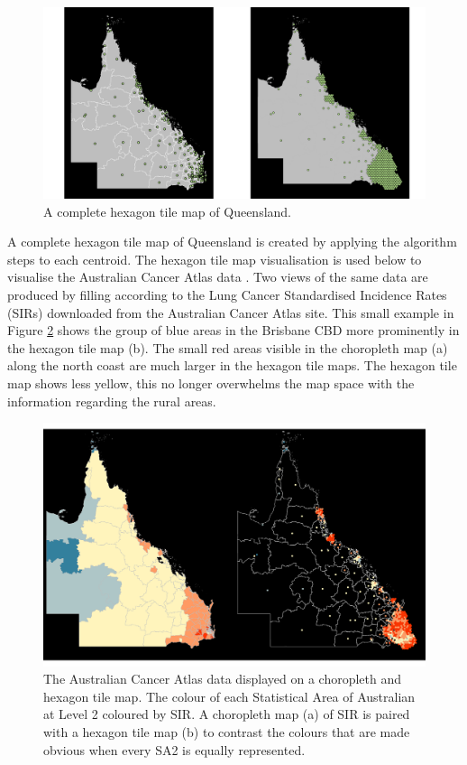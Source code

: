 \begin{figure}[h]
\centering
\includegraphics[width=16cm]{figures/6allocate.pdf}
\caption{\label{fig:buffs}A complete hexagon tile map of Queensland.}
\end{figure}

A complete hexagon tile map of Queensland is created by applying the
algorithm steps to each centroid. The hexagon tile map visualisation is
used below to visualise the Australian Cancer Atlas data \citep{TACA}.
Two views of the same data are produced by filling according to the Lung
Cancer Standardised Incidence Rates (SIRs) downloaded from the
Australian Cancer Atlas site. This small example in Figure \ref{fig:sir}
shows the group of blue areas in the Brisbane CBD more prominently in
the hexagon tile map (b). The small red areas visible in the choropleth
map (a) along the north coast are much larger in the hexagon tile maps.
The hexagon tile map shows less yellow, this no longer overwhelms the
map space with the information regarding the rural areas.

\begin{figure}[h]
\centering
\includegraphics[width=14cm]{figures/7SIR.pdf}
\caption{\label{fig:sir}The Australian Cancer Atlas data displayed on a choropleth and hexagon tile map. The colour of each Statistical Area of Australian at Level 2 coloured by SIR. A choropleth map (a) of SIR is paired with a hexagon tile map (b) to contrast the colours that are made obvious when every SA2 is equally represented.}
\end{figure}

